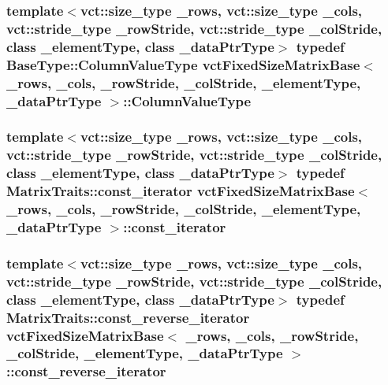 \subsubsection[{Column\+Value\+Type}]{\setlength{\rightskip}{0pt plus 5cm}template$<$vct\+::size\+\_\+type \+\_\+rows, vct\+::size\+\_\+type \+\_\+cols, vct\+::stride\+\_\+type \+\_\+row\+Stride, vct\+::stride\+\_\+type \+\_\+col\+Stride, class \+\_\+element\+Type, class \+\_\+data\+Ptr\+Type$>$ typedef {\bf Base\+Type\+::\+Column\+Value\+Type} {\bf vct\+Fixed\+Size\+Matrix\+Base}$<$ \+\_\+rows, \+\_\+cols, \+\_\+row\+Stride, \+\_\+col\+Stride, \+\_\+element\+Type, \+\_\+data\+Ptr\+Type $>$\+::{\bf Column\+Value\+Type}}\label{classvct_fixed_size_matrix_base_a7420316140dde042d228bc02fb98d4a7}
\hypertarget{classvct_fixed_size_matrix_base_a53dcfd245b0c11371d50c406fa59db61}{}
\subsubsection[{const\+\_\+iterator}]{\setlength{\rightskip}{0pt plus 5cm}template$<$vct\+::size\+\_\+type \+\_\+rows, vct\+::size\+\_\+type \+\_\+cols, vct\+::stride\+\_\+type \+\_\+row\+Stride, vct\+::stride\+\_\+type \+\_\+col\+Stride, class \+\_\+element\+Type, class \+\_\+data\+Ptr\+Type$>$ typedef {\bf Matrix\+Traits\+::const\+\_\+iterator} {\bf vct\+Fixed\+Size\+Matrix\+Base}$<$ \+\_\+rows, \+\_\+cols, \+\_\+row\+Stride, \+\_\+col\+Stride, \+\_\+element\+Type, \+\_\+data\+Ptr\+Type $>$\+::{\bf const\+\_\+iterator}}\label{classvct_fixed_size_matrix_base_a53dcfd245b0c11371d50c406fa59db61}
\hypertarget{classvct_fixed_size_matrix_base_a82f39f6102bda23fe977efe94ebf06dd}{}
\subsubsection[{const\+\_\+reverse\+\_\+iterator}]{\setlength{\rightskip}{0pt plus 5cm}template$<$vct\+::size\+\_\+type \+\_\+rows, vct\+::size\+\_\+type \+\_\+cols, vct\+::stride\+\_\+type \+\_\+row\+Stride, vct\+::stride\+\_\+type \+\_\+col\+Stride, class \+\_\+element\+Type, class \+\_\+data\+Ptr\+Type$>$ typedef {\bf Matrix\+Traits\+::const\+\_\+reverse\+\_\+iterator} {\bf vct\+Fixed\+Size\+Matrix\+Base}$<$ \+\_\+rows, \+\_\+cols, \+\_\+row\+Stride, \+\_\+col\+Stride, \+\_\+element\+Type, \+\_\+data\+Ptr\+Type $>$\+::{\bf const\+\_\+reverse\+\_\+iterator}}\label{classvct_fixed_size_matrix_base_a82f39f6102bda23fe977efe94ebf06dd}
\hypertarget{classvct_fixed_size_matrix_base_a5ef3c78aaccbfe9c5e4843bffa2770b5}{}
